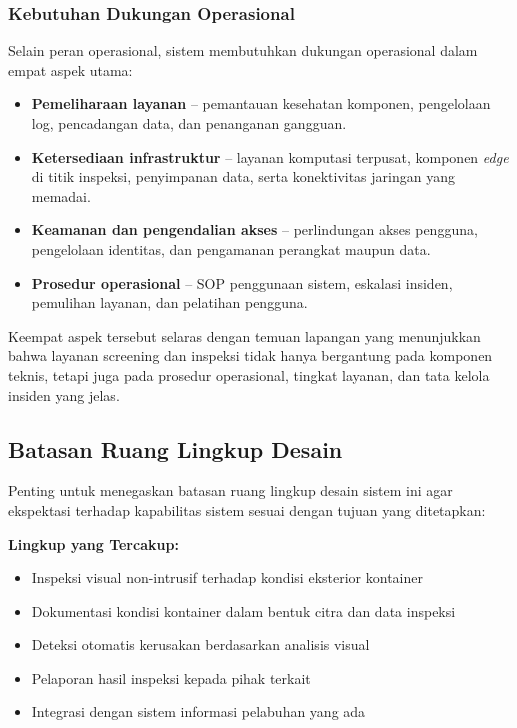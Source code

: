 \FloatBarrier

\subsubsection{Kebutuhan Dukungan Operasional}

Selain peran operasional, sistem membutuhkan dukungan operasional dalam empat
aspek utama:
\begin{itemize}
  \item \textbf{Pemeliharaan layanan} -- pemantauan kesehatan komponen, pengelolaan log, pencadangan data, dan penanganan gangguan.
  \item \textbf{Ketersediaan infrastruktur} -- layanan komputasi terpusat, komponen \textit{edge} di titik inspeksi, penyimpanan data, serta konektivitas jaringan yang memadai.
  \item \textbf{Keamanan dan pengendalian akses} -- perlindungan akses pengguna, pengelolaan identitas, dan pengamanan perangkat maupun data.
  \item \textbf{Prosedur operasional} -- SOP penggunaan sistem, eskalasi insiden, pemulihan layanan, dan pelatihan pengguna.
\end{itemize}

Keempat aspek tersebut selaras dengan temuan lapangan yang menunjukkan bahwa
layanan screening dan inspeksi tidak hanya bergantung pada komponen teknis,
tetapi juga pada prosedur operasional, tingkat layanan, dan tata kelola
insiden yang jelas.

\subsection{Batasan Ruang Lingkup Desain}

Penting untuk menegaskan batasan ruang lingkup desain sistem ini agar ekspektasi terhadap kapabilitas sistem sesuai dengan tujuan yang ditetapkan:

\textbf{Lingkup yang Tercakup:}
\begin{itemize}
  \item Inspeksi visual non-intrusif terhadap kondisi eksterior kontainer
  \item Dokumentasi kondisi kontainer dalam bentuk citra dan data inspeksi
  \item Deteksi otomatis kerusakan berdasarkan analisis visual
  \item Pelaporan hasil inspeksi kepada pihak terkait
  \item Integrasi dengan sistem informasi pelabuhan yang ada
\end{itemize}

